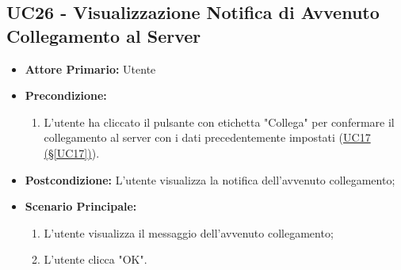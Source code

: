 \pagebreak

\subsection{UC26 - Visualizzazione Notifica di Avvenuto Collegamento al Server}\label{UC26}

\begin{itemize}
	\item \textbf{Attore Primario:}  Utente
	\item \textbf{Precondizione:}
	\begin{enumerate}
		\item L'utente ha cliccato il pulsante con etichetta "Collega" per confermare il collegamento al server con i dati precedentemente impostati (\hyperref[UC17]{UC17 (§\ref*{UC17})}).
	\end{enumerate}
	\item \textbf{Postcondizione:} L'utente visualizza la notifica dell'avvenuto collegamento;
	\item \textbf{Scenario Principale:}
	\begin{enumerate}
		\item L'utente visualizza il messaggio dell'avvenuto collegamento;
		\item L'utente clicca "OK".
	\end{enumerate}
\end{itemize}
